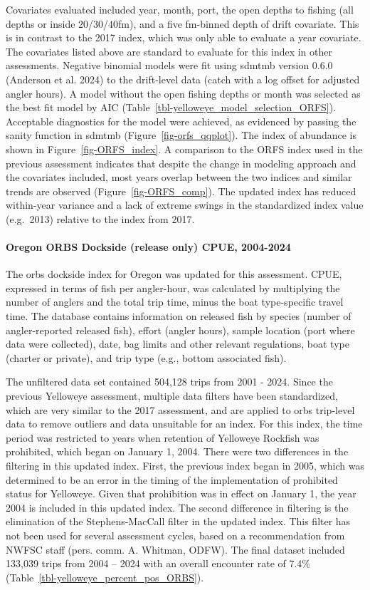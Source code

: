 \documentclass[
]{scrartcl}
\let\oldparagraph\paragraph
\renewcommand{\paragraph}[1]{\oldparagraph{#1}\mbox{}}
\begin{document}
Covariates evaluated included year, month, port, the open depths to
fishing (all depths or inside 20/30/40fm), and a five fm-binned depth of
drift covariate. This is in contrast to the 2017 index, which was only
able to evaluate a year covariate. The covariates listed above are
standard to evaluate for this index in other assessments. Negative
binomial models were fit using \gls{sdmtmb} version 0.6.0 (Anderson et
al. 2024) to the drift-level data (catch with a log offset for adjusted
angler hours). A model without the open fishing depths or month was
selected as the best fit model by AIC
(Table~\ref{tbl-yelloweye_model_selection_ORFS}). Acceptable diagnostics
for the model were achieved, as evidenced by passing the sanity function
in \gls{sdmtmb} (Figure~\ref{fig-orfs_qqplot}). The index of abundance
is shown in Figure~\ref{fig-ORFS_index}. A comparison to the ORFS index
used in the previous assessment indicates that despite the change in
modeling approach and the covariates included, most years overlap
between the two indices and similar trends are observed
(Figure~\ref{fig-ORFS_comp}). The updated index has reduced within-year
variance and a lack of extreme swings in the standardized index value
(e.g.~2013) relative to the index from 2017.

\paragraph{Oregon ORBS Dockside (release only) CPUE,
2004-2024}\label{oregon-orbs-dockside-release-only-cpue-2004-2024}

The \gls{orbs} dockside index for Oregon was updated for this
assessment. CPUE, expressed in terms of fish per angler-hour, was
calculated by multiplying the number of anglers and the total trip time,
minus the boat type-specific travel time. The database contains
information on released fish by species (number of angler-reported
released fish), effort (angler hours), sample location (port where data
were collected), date, bag limits and other relevant regulations, boat
type (charter or private), and trip type (e.g., bottom associated fish).

The unfiltered data set contained 504,128 trips from 2001 - 2024. Since
the previous Yelloweye assessment, multiple data filters have been
standardized, which are very similar to the 2017 assessment, and are
applied to \gls{orbs} trip-level data to remove outliers and data
unsuitable for an index. For this index, the time period was restricted
to years when retention of Yelloweye Rockfish was prohibited, which
began on January 1, 2004. There were two differences in the filtering in
this updated index. First, the previous index began in 2005, which was
determined to be an error in the timing of the implementation of
prohibited status for Yelloweye. Given that prohibition was in effect on
January 1, the year 2004 is included in this updated index. The second
difference in filtering is the elimination of the Stephens-MacCall
filter in the updated index. This filter has not been used for several
assessment cycles, based on a recommendation from NWFSC staff (pers.
comm. A. Whitman, ODFW). The final dataset included 133,039 trips from
2004 -- 2024 with an overall encounter rate of 7.4\%
(Table~\ref{tbl-yelloweye_percent_pos_ORBS}).
\end{document}
